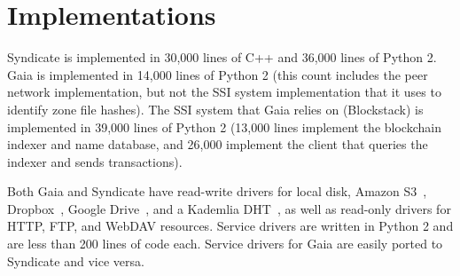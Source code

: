 \section{Implementations}

Syndicate is implemented in 30,000 lines of C++ and 36,000 lines of Python 2.
Gaia is implemented in 14,000 lines of Python 2 (this count includes the peer 
network implementation, but not the SSI system implementation that it uses to
identify zone file hashes).  The SSI system that Gaia relies on (Blockstack) is
implemented in 39,000 lines of Python 2 (13,000 lines implement the
blockchain indexer and name database, and 26,000 implement the client that
queries the indexer and sends transactions).

Both Gaia and Syndicate have read-write drivers for local disk, Amazon S3~\cite{s3}, 
Dropbox~\cite{dropbox}, Google Drive~\cite{gdrive}, and a Kademlia
DHT~\cite{kademlia}, as well as read-only drivers for HTTP, FTP, and WebDAV
resources.  Service drivers are written in Python 2 and are less than 200 lines of code
each.  Service drivers for Gaia are easily ported to Syndicate and vice versa.


